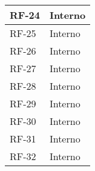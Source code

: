 \begin{longtable}{|>{\centering\arraybackslash}m{}|>{\centering\arraybackslash}m{}|}
	RF-24              & Interno                                                                                                                                                                                                                                              \\\hline
	RF-25              & Interno                                                                                                                                                                                                                                              \\\hline
	RF-26              & Interno                                                                                                                                                                                                                                              \\\hline
	RF-27              & Interno                                                                                                                                                                                                                                              \\\hline
	RF-28              & Interno                                                                                                                                                                                                                                              \\\hline
	RF-29              & Interno                                                                                                                                                                                                                                              \\\hline
	RF-30              & Interno                                                                                                                                                                                                                                              \\\hline
	RF-31              & Interno                                                                                                                                                                                                                                              \\\hline
	RF-32              & Interno                                                                                                                                                                                                                                              \\\hline

\end{longtable}
